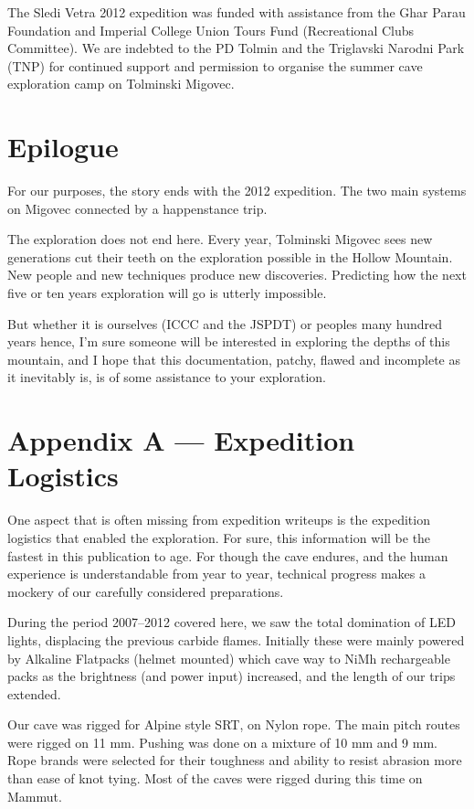 The Sledi Vetra 2012 expedition was funded with assistance from the Ghar
Parau Foundation and Imperial College Union Tours Fund (Recreational
Clubs Committee). We are indebted to the PD Tolmin and the Triglavski
Narodni Park (TNP) for continued support and permission to organise the
summer cave exploration camp on Tolminski Migovec.

\chapter{Epilogue}\label{epilogue}

For our purposes, the story ends with the 2012 expedition. The two main
systems on Migovec connected by a happenstance trip.

The exploration does not end here. Every year, Tolminski Migovec sees
new generations cut their teeth on the exploration possible in the
Hollow Mountain. New people and new techniques produce new discoveries.
Predicting how the next five or ten years exploration will go is utterly
impossible.

But whether it is ourselves (ICCC and the JSPDT) or peoples many hundred
years hence, I'm sure someone will be interested in exploring the depths
of this mountain, and I hope that this documentation, patchy, flawed and
incomplete as it inevitably is, is of some assistance to your
exploration.

\chapter{Appendix A --- Expedition
Logistics}\label{appendix-a-expedition-logistics}

One aspect that is often missing from expedition writeups is the
expedition logistics that enabled the exploration. For sure, this
information will be the fastest in this publication to age. For though
the cave endures, and the human experience is understandable from year
to year, technical progress makes a mockery of our carefully considered
preparations.

During the period 2007--2012 covered here, we saw the total domination
of LED lights, displacing the previous carbide flames. Initially these
were mainly powered by Alkaline Flatpacks (helmet mounted) which cave
way to NiMh rechargeable packs as the brightness (and power input)
increased, and the length of our trips extended.

Our cave was rigged for Alpine style SRT, on Nylon rope. The main pitch
routes were rigged on 11 mm. Pushing was done on a mixture of 10 mm and
9 mm. Rope brands were selected for their toughness and ability to
resist abrasion more than ease of knot tying. Most of the caves were
rigged during this time on Mammut.

